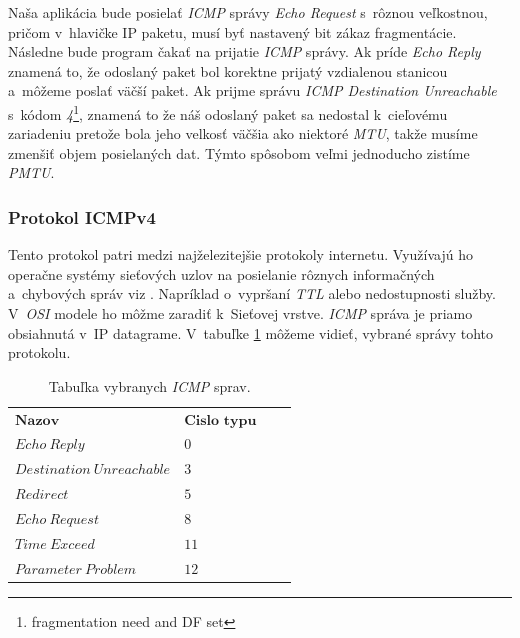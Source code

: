 \documentclass[12pt,a4paper,titlepage]{article}
\begin{document}
        Naša aplikácia bude posielať \emph{ICMP} správy \emph{Echo Request} s~rôznou veľkostnou, 
        pričom v~hlavičke IP paketu, musí byť nastavený bit zákaz fragmentácie. Následne bude 
        program čakať na prijatie \emph{ICMP} správy. Ak príde \emph{Echo Reply} znamená to, 
        že odoslaný paket bol korektne prijatý vzdialenou stanicou a~môžeme poslať väčší paket.
        Ak prijme správu \emph{ICMP Destination Unreachable} s~kódom 
        \emph{4}\footnote{fragmentation need and DF set}, znamená to že náš odoslaný paket 
        sa nedostal k~cieľovému zariadeniu pretože bola jeho velkosť väčšia ako niektoré
        \emph{MTU}, takže musíme zmenšiť objem posielaných dat.
        Týmto spôsobom veľmi jednoducho zistíme \emph{PMTU}.

    \subsubsection{Protokol ICMPv4}
        Tento protokol patri medzi najželezitejšie protokoly internetu. 
        Využívajú ho operačne systémy sieťových uzlov na posielanie rôznych 
        informačných a~chybových správ viz \cite{rfc_icmp}. Napríklad o~vypršaní
        \emph{TTL} alebo nedostupnosti služby. V~\emph{OSI} modele 
        ho môžme zaradiť k~Sieťovej vrstve. \emph{ICMP} správa je priamo obsiahnutá
        v~IP datagrame. V~tabuľke \ref{tabulka_icmp} môžeme vidieť, vybrané
        správy tohto protokolu.

        \begin{table}[h!]
            \begin{center}
                \begin{tabular}{llll}
                    $ \textbf{Nazov} $ & $ \textbf{Cislo typu} $ \\ $  Echo\ Reply $ & $ 0 $ \\
                    $  Destination\ Unreachable $ & $ 3 $ \\
                    $  Redirect $ & $ 5 $\\
                    $  Echo\ Request $ & $ 8 $\\
                    $  Time\ Exceed $ & $ 11 $\\
                    $  Parameter\ Problem $ & $ 12 $\\
                \end{tabular}
                \caption{Tabuľka vybranych \emph{ICMP} sprav.} \label{tabulka_icmp}
            \end{center}
        \end{table}
\end{document}

